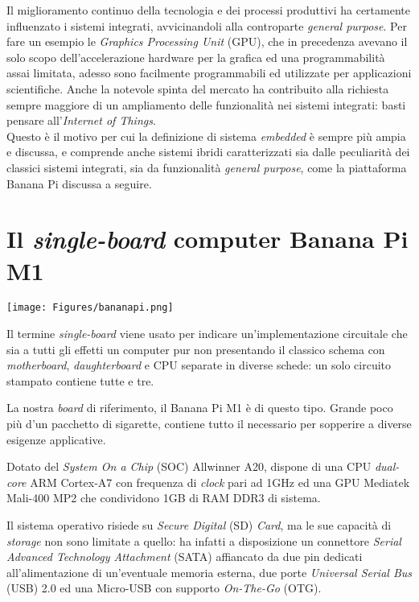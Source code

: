 Il miglioramento continuo della tecnologia e dei processi produttivi ha 
certamente influenzato i sistemi integrati, avvicinandoli alla controparte 
\emph{general purpose}. Per fare un esempio le \emph{Graphics Processing Unit} 
(GPU), 
che in precedenza avevano il solo 
scopo dell'accelerazione hardware per la grafica ed una programmabilità assai 
limitata, adesso sono facilmente programmabili ed utilizzate per applicazioni 
scientifiche. Anche la notevole spinta del mercato ha 
contribuito alla richiesta sempre maggiore di un ampliamento delle 
funzionalità nei sistemi integrati: basti pensare all'\emph{Internet of 
Things}. \\
Questo è il motivo per cui la definizione di sistema \emph{embedded} è sempre 
più ampia e discussa, e comprende anche sistemi ibridi caratterizzati sia 
dalle peculiarità dei classici sistemi integrati, sia da funzionalità 
\emph{general purpose}, come la piattaforma Banana Pi discussa a seguire.

\newpage
\section{Il \emph{single-board} computer Banana Pi M1}
\begin{center}
\texttt{[image: Figures/bananapi.png]}\\
\end{center}
Il termine \emph{single-board} viene usato per indicare un'implementazione 
circuitale che sia a tutti gli effetti un computer pur non presentando il 
classico schema con \emph{motherboard}, \emph{daughterboard} e CPU separate in 
diverse schede: un solo circuito stampato contiene tutte e tre.

La nostra \emph{board} di riferimento, il Banana Pi M1 è di questo tipo. Grande 
poco più d'un pacchetto di sigarette, contiene tutto il necessario per 
sopperire a diverse esigenze applicative.

Dotato del \emph{System On a Chip} (SOC) Allwinner A20, dispone di una 
CPU \emph{dual-core} ARM Cortex-A7 con frequenza di 
\textit{clock} pari ad 1GHz ed una GPU
Mediatek Mali-400 MP2 che condividono 1GB di RAM DDR3 di sistema.

Il sistema operativo risiede su \textit{Secure Digital} (SD) \textit{Card}, ma 
le sue capacità di \emph{storage} non sono limitate a quello: ha infatti a 
disposizione un connettore \textit{Serial Advanced Technology Attachment} 
(SATA) affiancato da due pin dedicati all'alimentazione di un'eventuale 
memoria esterna, due porte \textit{Universal Serial Bus} (USB) 2.0 ed una 
Micro-USB con supporto \textit{On-The-Go} (OTG).

